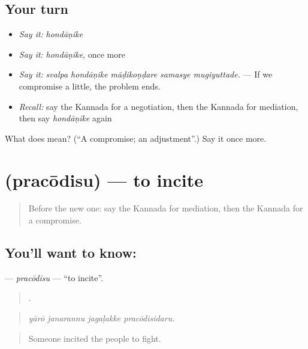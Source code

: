 \subsection*{Your turn}
\begin{itemize}
\raggedright
  \item \emph{Say it:} \emph{hondāṇike}
  \item \emph{Say it:} \emph{hondāṇike}, once more
  \item \emph{Say it:} \emph{svalpa hondāṇike māḍikoṇḍare samasye mugiyuttade.} — If we compromise a little, the problem ends.
  \item \emph{Recall:} say the Kannada for a negotiation, then the Kannada for mediation, then say \emph{hondāṇike} again
\end{itemize}

\begin{tcolorbox}[breakable,colback=teal!4,colframe=teal!35!black,title={Before you move on}]
What does  mean? (\textquotedblleft{}A compromise; an adjustment\textquotedblright{}.) Say it once more.
\end{tcolorbox}
\section[\texorpdfstring{\kn{ಪ್ರಚೋದಿಸು} (pracōdisu)}{ಪ್ರಚೋದಿಸು (pracōdisu)}]{ (pracōdisu) — to incite}

\label{lesson:KA-C405-pracodisu}



\begin{quote}
Before the new one: say the Kannada for mediation, then the Kannada for a compromise.
\end{quote}

\subsection*{You'll want to know: }
\textbf{} — \emph{pracōdisu} — \textquotedblleft{}to incite\textquotedblright{}.

\begin{quote}
   .
\end{quote}

\begin{quote}
\emph{yārō janarannu jagaḷakke pracōdisidaru.}
\end{quote}

\begin{quote}
Someone incited the people to fight.
\end{quote}

